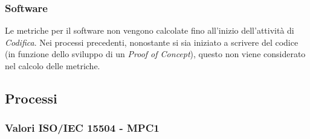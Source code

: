 \subsubsection{Software}
Le metriche per il software non vengono calcolate fino all'inizio dell'attività di \textit{Codifica}. Nei processi precedenti, nonostante si sia iniziato a scrivere del codice (in funzione dello sviluppo di un \textit{Proof of Concept}), questo non viene considerato nel calcolo delle metriche.

\subsection{Processi}
\subsubsection{Valori ISO/IEC 15504 - MPC1}

